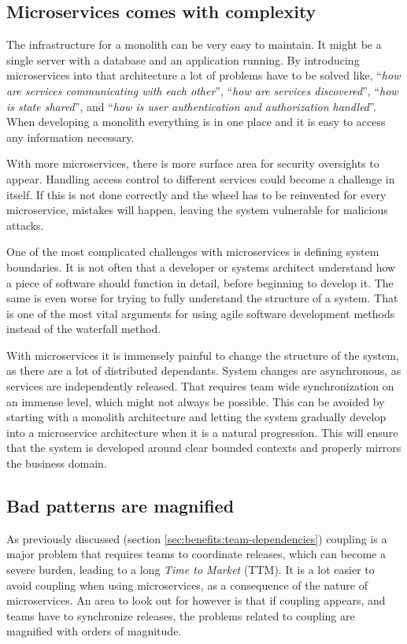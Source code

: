 \documentclass[a4paper]{article}
\begin{document}
\subsection{Microservices comes with complexity}
\label{sec:pitfalls:complexity}
The infrastructure for a monolith can be very easy to maintain. It might be a single server with a database and an application running. By introducing microservices into that architecture a lot of problems have to be solved like, ``\textit{how are services communicating with each other}'', ``\textit{how are services discovered}'', ``\textit{how is state shared}'', and ``\textit{how is user authentication and authorization handled}''. When developing a monolith everything is in one place and it is easy to access any information necessary.

With more microservices, there is more surface area for security oversights to appear. Handling access control to different services could become a challenge in itself. If this is not done correctly and the wheel has to be reinvented for every microservice, mistakes will happen, leaving the system vulnerable for malicious attacks.

One of the most complicated challenges with microservices is defining system boundaries. It is not often that a developer or systems architect understand how a piece of software should function in detail, before beginning to develop it. The same is even worse for trying to fully understand the structure of a system. That is one of the most vital arguments for using agile software development methods instead of the waterfall method.

With microservices it is immensely painful to change the structure of the system, as there are a lot of distributed dependants. System changes are asynchronous, as services are independently released. That requires team wide synchronization on an immense level, which might not always be possible. This can be avoided by starting with a monolith architecture and letting the system gradually develop into a microservice architecture when it is a natural progression. This will ensure that the system is developed around clear bounded contexts and properly mirrors the business domain. \cite{Fowler2015}

\subsection{Bad patterns are magnified}

As previously discussed (section \ref{sec:benefits:team-dependencies}) coupling is a major problem that requires teams to coordinate releases, which can become a severe burden, leading to a long \textit{Time to Market} (TTM). It is a lot easier to avoid coupling when using microservices, as a consequence of the nature of microservices. An area to look out for however is that if coupling appears, and teams have to synchronize releases, the problems related to coupling are magnified with orders of magnitude.
\end{document}
